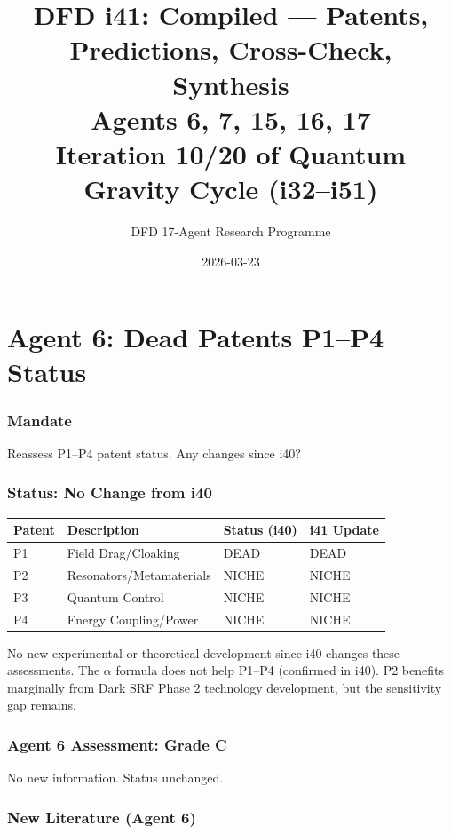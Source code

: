 \documentclass[11pt,a4paper]{article}
\title{DFD i41: Compiled --- Patents, Predictions, Cross-Check, Synthesis\\[6pt]
\large Agents 6, 7, 15, 16, 17\\[6pt]
\normalsize Iteration 10/20 of Quantum Gravity Cycle (i32--i51)}
\author{DFD 17-Agent Research Programme}
\date{2026-03-23}
\begin{document}
\maketitle
\tableofcontents
\newpage

\part{Agent 6: Dead Patents P1--P4 Status}
\label{part:agent6}

\section{Mandate}

Reassess P1--P4 patent status. Any changes since i40?

\section{Status: No Change from i40}

\begin{center}
\begin{tabular}{llll}
\toprule
\textbf{Patent} & \textbf{Description} & \textbf{Status (i40)} & \textbf{i41 Update} \\
\midrule
P1 & Field Drag/Cloaking & DEAD & DEAD \\
P2 & Resonators/Metamaterials & NICHE & NICHE \\
P3 & Quantum Control & NICHE & NICHE \\
P4 & Energy Coupling/Power & NICHE & NICHE \\
\bottomrule
\end{tabular}
\end{center}

No new experimental or theoretical development since i40 changes these assessments. The $\alpha$ formula does not help P1--P4 (confirmed in i40). P2 benefits marginally from Dark SRF Phase 2 technology development, but the sensitivity gap remains.

\section{Agent 6 Assessment: Grade C}

No new information. Status unchanged.

\section{New Literature (Agent 6)}
\end{document}
